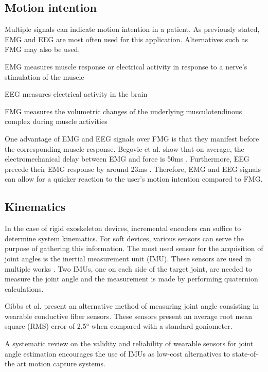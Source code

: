 \subsection{Motion intention}
Multiple signals can indicate motion intention in a patient. As previously stated, 
EMG and EEG are most often used for this application. Alternatives such as FMG may 
also be used.  
\begin{IEEEitemize}
\item EMG measures muscle response or electrical activity in response to a nerve's 
stimulation of the muscle
\item EEG measures electrical activity in the brain
\item FMG measures the volumetric changes of the underlying musculotendinous complex 
during muscle activities \cite{jiang_exploration_2017}
\end{IEEEitemize}
One advantage of EMG and EEG signals over FMG is that they manifest before the 
corresponding muscle response. Begovic et al. show that on average, the electromechanical 
delay between EMG and force is 50ms \cite{begovic_detection_2014}. Furthermore, 
EEG precede their EMG response by around 23ms \cite{xu_delay_2016}. Therefore, 
EMG and EEG signals can allow for a quicker reaction to the user's motion intention 
compared to FMG. 
\subsection{Kinematics}
In the case of rigid exoskeleton devices, incremental encoders can suffice to 
determine system kinematics. For soft devices, various sensors can serve the 
purpose of gathering this information. The most used sensor for the 
acquisition of joint angles is the inertial 
measurement unit (IMU). These sensors are used in multiple works \cite{lu_development_2019, 
wu_adaptive_2023}. Two IMUs, one on each side of the target joint, 
are needed to measure the joint angle and the measurement is made by performing quaternion 
calculations. 

Gibbs et al. \cite{gibbs_wearable_2005} present an alternative 
method of measuring joint angle consisting in wearable conductive fiber sensors. 
These sensors present an average root mean square (RMS) error of 2.5° when 
compared with a standard goniometer.  

A systematic review on the validity and reliability of wearable sensors for joint 
angle estimation \cite{poitras_validity_2019} encourages the use of IMUs as low-cost 
alternatives to state-of-the art motion capture systems.  

